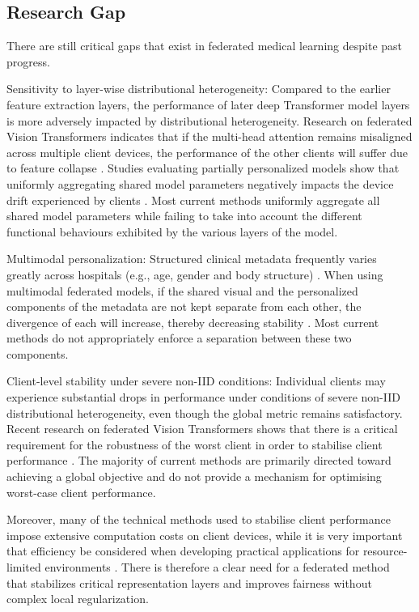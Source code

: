 \documentclass{ieeeaccess}
\begin{document}
\subsection{Research Gap}

There are still critical gaps that exist in federated medical learning despite past progress.

Sensitivity to layer-wise distributional heterogeneity: Compared to the earlier feature extraction layers, the performance of later deep Transformer model layers is more adversely impacted by distributional heterogeneity. Research on federated Vision Transformers indicates that if the multi-head attention remains misaligned across multiple client devices, the performance of the other clients will suffer due to feature collapse \cite{Darzi2024}. Studies evaluating partially personalized models show that uniformly aggregating shared model parameters negatively impacts the device drift experienced by clients \cite{Zhu2025}. Most current methods uniformly aggregate all shared model parameters while failing to take into account the different functional behaviours exhibited by the various layers of the model.

Multimodal personalization: Structured clinical metadata frequently varies greatly across hospitals (e.g., age, gender and body structure) \cite{Nunnari2020}. When using multimodal federated models, if the shared visual and the personalized components of the metadata are not kept separate from each other, the divergence of each will increase, thereby decreasing stability \cite{Zhu2025}. Most current methods do not appropriately enforce a separation between these two components.

Client-level stability under severe non-IID conditions: Individual clients may experience substantial drops in performance under conditions of severe non-IID distributional heterogeneity, even though the global metric remains satisfactory. Recent research on federated Vision Transformers shows that there is a critical requirement for the robustness of the worst client in order to stabilise client performance \cite{Darzi2024,Zhao2025}. The majority of current methods are primarily directed toward achieving a global objective and do not provide a mechanism for optimising worst-case client performance.

Moreover, many of the technical methods used to stabilise client performance impose extensive computation costs on client devices, while it is very important that efficiency be considered when developing practical applications for resource-limited environments \cite{Wu2024}. There is therefore a clear need for a federated method that stabilizes critical representation layers and improves fairness without complex local regularization.
\end{document}
